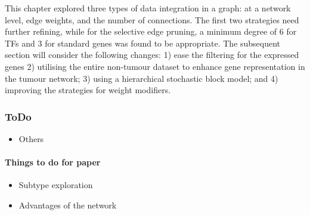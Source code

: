 This chapter explored three types of data integration in a graph: at a network level, edge weights, and the number of connections. The first two strategies need further refining, while for the selective edge pruning, a minimum degree of 6 for TFs and 3 for standard genes was found to be appropriate. The subsequent section will consider the following changes: 1) ease the filtering for the expressed genes 2) utilising the entire non-tumour dataset to enhance gene representation in the tumour network; 3) using a hierarchical stochastic block model; and 4) improving the strategies for weight modifiers.

\newpage

\subsubsection{ToDo}

\begin{itemize}
    \item Others 
\end{itemize}

\paragraph*{Things to do for paper}

\begin{itemize}
    \item Subtype exploration
    \item Advantages of the network
\end{itemize}
